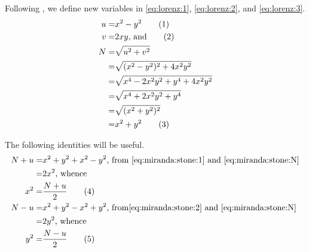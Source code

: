 \documentclass[]{article}
\newcommand\numberthis{\addtocounter{equation}{1}\tag{\theequation}}
\begin{document}
Following \cite{miranda1993proto}, we define new variables in \eqref{eq:lorenz:1},  \eqref{eq:lorenz:2}, and \eqref{eq:lorenz:3}.
\begin{align*}
	u =& x^2-y^2 \numberthis \label{eq:miranda:stone:1}\\
	v =& 2 x y \text{, and}\numberthis \label{eq:miranda:stone:2}\\
	N =& \sqrt{u^2+v^2}\\
	=& \sqrt{(x^2-y^2)^2 + 4x^2y^2}\\
	=& \sqrt{x^4 - 2 x^2 y^2 + y^4  + 4x^2y^2}\\
	=& \sqrt{x^4 + 2 x^2 y^2 + y^4}\\
	=& \sqrt{(x^2+y^2)^2}\\
	=& x^2+y^2 \numberthis \label{eq:miranda:stone:N}
\end{align*}

The following identities will be useful.
\begin{align*}
	N+u= & x^2+y^2 + x^2 - y^2 \text{, from \eqref{eq:miranda:stone:1} and \eqref{eq:miranda:stone:N}} \\
	=& 2 x^2 \text{, whence}\\
	x^2 =& \frac{N+u}{2}\numberthis \label{eq:miranda:stone:x}\\
	N - u =& x^2+y^2 - x^2 + y^2 \text{, from\eqref{eq:miranda:stone:2} and \eqref{eq:miranda:stone:N}}\\
	=& 2 y^2 \text{, whence}\\
	y^2 =& \frac{N-u}{2}\numberthis \label{eq:miranda:stone:y}	
\end{align*}
\end{document}
